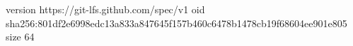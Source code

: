 version https://git-lfs.github.com/spec/v1
oid sha256:801df2e6998edc13a833a847645f157b460c6478b1478cb19f68604ee901e805
size 64
